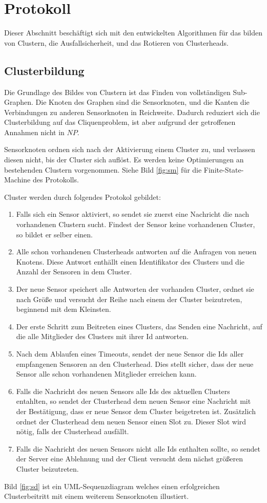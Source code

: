 \section{Protokoll} \label{sec:algo}
Dieser Abschnitt besch\"aftigt sich mit den entwickelten Algorithmen f\"ur das bilden von Clustern, die Ausfallsicherheit, und das Rotieren von Clusterheads.

\subsection{Clusterbildung}
Die Grundlage des Bildes von Clustern ist das Finden von vollst\"andigen Sub-Graphen.
Die Knoten des Graphen sind die Sensorknoten, und die Kanten die Verbindungen zu anderen Sensorknoten in Reichweite.
Dadurch reduziert sich die Clusterbildung auf das Cliquenproblem, ist aber aufgrund der getroffenen Annahmen nicht in $NP$.

Sensorknoten ordnen sich nach der Aktivierung einem Cluster zu, und verlassen diesen nicht, bis der Cluster sich aufl\"ost. Es werden keine Optimierungen an bestehenden Clustern vorgenommen.
Siehe Bild \ref{fig:sm} f\"ur die Finite-State-Machine des Protokolls.

Cluster werden durch folgendes Protokol gebildet:
\begin{enumerate}
\item Falls sich ein Sensor aktiviert, so sendet sie zuerst eine Nachricht die nach vorhandenen Clustern sucht. Findest der Sensor keine vorhandenen Cluster, so bildet er selber einen.
\item Alle schon vorhandenen Clusterheads antworten auf die Anfragen von neuen Knotens. Diese Antwort enth\"allt einen Identifikator des Clusters und die Anzahl der Sensoren in dem Cluster.
\item Der neue Sensor speichert alle Antworten der vorhanden Cluster, ordnet sie nach Gr\"o\ss e und versucht der Reihe nach einem der Cluster beizutreten, beginnend mit dem Kleinsten.
\item Der erste Schritt zum Beitreten eines Clusters, das Senden eine Nachricht, auf die alle Mitglieder des Clusters mit ihrer Id antworten.
\item Nach dem Ablaufen eines Timeouts, sendet der neue Sensor die Ids aller empfangenen Sensoren an den Clusterhead. Dies stellt sicher, dass der neue Sensor alle schon vorhandenen Mitglieder erreichen kann.
\item Falls die Nachricht des neuen Sensors alle Ids des aktuellen Clusters entahlten, so sendet der Clusterhead dem neuen Sensor eine Nachricht mit der Best\"atigung, dass er neue Sensor dem Cluster beigetreten ist. Zus\"atzlich ordnet der Clusterhead dem neuen Sensor einen Slot zu. Dieser Slot wird n\"otig, falls der Clusterhead ausf\"allt.
\item Falls die Nachricht des neuen Sensors nicht alle Ids enthalten sollte, so sendet der Server eine Ablehnung und der Client versucht dem n\"achst gr\"o\ss eren Cluster beizutreten.
\end{enumerate}
Bild \ref{fig:sd} ist ein UML-Sequenzdiagram welches einen erfolgreichen Clusterbeitritt mit einem weiterem Sensorknoten illustiert.


